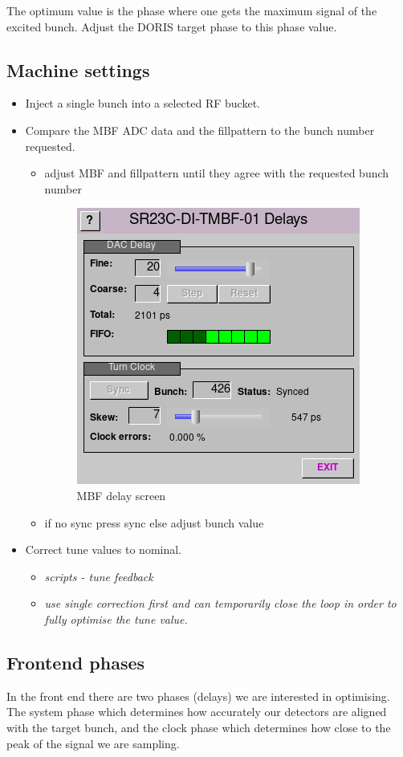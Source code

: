 \documentclass{report}
\begin{document}
The optimum value is the phase where one gets the maximum signal of the excited bunch. Adjust the DORIS target phase to this phase value.
\clearpage
\subsection{Machine settings}
\begin{itemize}
    \item {Inject a single bunch into a selected RF bucket.}
    \item{Compare the MBF ADC data and the fillpattern to the bunch number requested.}
    \begin{itemize}
        \item{adjust MBF and fillpattern until they agree with the requested bunch number}
        \begin{figure}[h]
            \centering
            \includegraphics[width=0.6\linewidth]{MBF_delays.png}
            \caption{MBF delay screen}
            \label{fig:MBF_delays}
        \end{figure}
        \item{if no sync press sync else adjust bunch value}
    \end{itemize}
    \item{Correct tune values to nominal.}
    \begin{itemize}
        \item{\textit{scripts - tune feedback}}
        \item{\textit{use single correction first and can temporarily close the loop in order to fully optimise the tune value.}}
    \end{itemize}
\end{itemize}

\subsection{Frontend phases} 
In the front end there are two phases (delays) we are interested in optimising. The system phase which determines how accurately our detectors are aligned with the target bunch, and the clock phase which determines how close to the peak of the signal we are sampling. 
\end{document}
